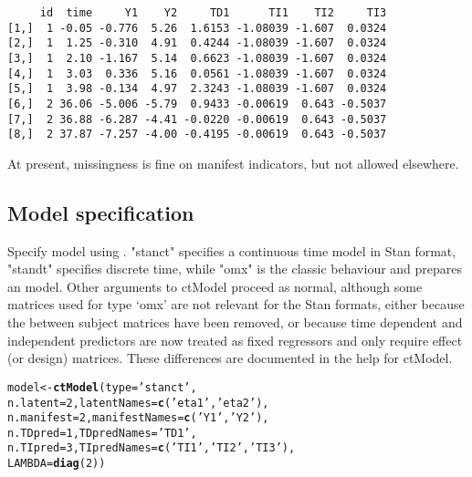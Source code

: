\documentclass[nojss]{jss}\usepackage[]{graphicx}\usepackage[]{color}
\makeatletter
\newcommand{\hlnum}[1]{\textcolor[rgb]{0.686,0.059,0.569}{#1}}%
\newcommand{\hlstr}[1]{\textcolor[rgb]{0.192,0.494,0.8}{#1}}%
\newcommand{\hlstd}[1]{\textcolor[rgb]{0.345,0.345,0.345}{#1}}%
\newcommand{\hlkwb}[1]{\textcolor[rgb]{0.69,0.353,0.396}{#1}}%
\newcommand{\hlkwc}[1]{\textcolor[rgb]{0.333,0.667,0.333}{#1}}%
\newcommand{\hlkwd}[1]{\textcolor[rgb]{0.737,0.353,0.396}{\textbf{#1}}}%
\newenvironment{kframe}{%
 \def\at@end@of@kframe{}%
 \ifinner\ifhmode%
  \def\at@end@of@kframe{\end{minipage}}%
  \begin{minipage}{\columnwidth}%
 \fi\fi%
 \def\FrameCommand##1{\hskip\@totalleftmargin \hskip-\fboxsep
 \colorbox{shadecolor}{##1}\hskip-\fboxsep
     \hskip-\linewidth \hskip-\@totalleftmargin \hskip\columnwidth}%
 \MakeFramed {\advance\hsize-\width
   \@totalleftmargin\z@ \linewidth\hsize
   \@setminipage}}%
 {\par\unskip\endMakeFramed%
 \at@end@of@kframe}
\newenvironment{knitrout}{}{} %
\makeatother
\begin{document}
\begin{knitrout}\footnotesize
{}\color{fgcolor}\begin{kframe}
\begin{verbatim}
     id  time     Y1    Y2     TD1      TI1    TI2     TI3
[1,]  1 -0.05 -0.776  5.26  1.6153 -1.08039 -1.607  0.0324
[2,]  1  1.25 -0.310  4.91  0.4244 -1.08039 -1.607  0.0324
[3,]  1  2.10 -1.167  5.14  0.6623 -1.08039 -1.607  0.0324
[4,]  1  3.03  0.336  5.16  0.0561 -1.08039 -1.607  0.0324
[5,]  1  3.98 -0.134  4.97  2.3243 -1.08039 -1.607  0.0324
[6,]  2 36.06 -5.006 -5.79  0.9433 -0.00619  0.643 -0.5037
[7,]  2 36.88 -6.287 -4.41 -0.0220 -0.00619  0.643 -0.5037
[8,]  2 37.87 -7.257 -4.00 -0.4195 -0.00619  0.643 -0.5037
\end{verbatim}
\end{kframe}
\end{knitrout}

At present, missingness is fine on manifest indicators, but not allowed elsewhere.

\subsection{Model specification}
Specify model using . "stanct" specifies a continuous time model in Stan format, "standt" specifies discrete time, while "omx" is the classic  behaviour and prepares an  model. Other arguments to ctModel proceed as normal, although some matrices used for type `omx' are not relevant for the Stan formats, either because the between subject matrices have been removed, or because time dependent and independent predictors are now treated as fixed regressors and only require effect (or design) matrices. These differences are documented in the help for ctModel.

\begin{knitrout}\small
{}\color{fgcolor}\begin{kframe}
\begin{alltt}
\hlstd{model}\hlkwb{<-}\hlkwd{ctModel}\hlstd{(}\hlkwc{type}\hlstd{=}\hlstr{'stanct'}\hlstd{,}
  \hlkwc{n.latent}\hlstd{=}\hlnum{2}\hlstd{,} \hlkwc{latentNames}\hlstd{=}\hlkwd{c}\hlstd{(}\hlstr{'eta1'}\hlstd{,}\hlstr{'eta2'}\hlstd{),}
  \hlkwc{n.manifest}\hlstd{=}\hlnum{2}\hlstd{,} \hlkwc{manifestNames}\hlstd{=}\hlkwd{c}\hlstd{(}\hlstr{'Y1'}\hlstd{,}\hlstr{'Y2'}\hlstd{),}
  \hlkwc{n.TDpred}\hlstd{=}\hlnum{1}\hlstd{,} \hlkwc{TDpredNames}\hlstd{=}\hlstr{'TD1'}\hlstd{,}
  \hlkwc{n.TIpred}\hlstd{=}\hlnum{3}\hlstd{,} \hlkwc{TIpredNames}\hlstd{=}\hlkwd{c}\hlstd{(}\hlstr{'TI1'}\hlstd{,}\hlstr{'TI2'}\hlstd{,}\hlstr{'TI3'}\hlstd{),}
  \hlkwc{LAMBDA}\hlstd{=}\hlkwd{diag}\hlstd{(}\hlnum{2}\hlstd{))}
\end{alltt}
\end{kframe}
\end{knitrout}
\end{document}
